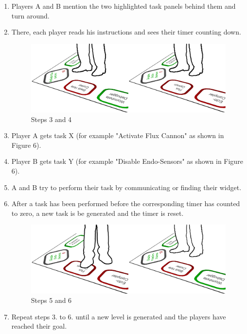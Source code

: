 \documentclass{sigchi}
\begin{document}
\begin{enumerate}
\item Players A and B mention the two highlighted task panels behind them and turn around.
\item There, each player reads his instructions and sees their timer counting down.


\begin{figure}[H]
\centering
\includegraphics[width=0.99\columnwidth]{walkthrough/klein/gamingarea3+4}
\caption{Steps 3 and 4}
\label{fig:gamingArea}
\end{figure}

\item Player A gets task X (for example "Activate Flux Cannon" as shown in Figure 6).
\item Player B gets task Y (for example "Disable Endo-Sensors" as shown in Figure 6).
\item A and B try to perform their task by communicating or finding their widget.
\item After a task has been performed before the corresponding timer has counted to zero, a new task is be generated and the timer is reset.

\begin{figure}[H]
\centering
\includegraphics[width=0.99\columnwidth]{walkthrough/klein/gamingarea5+6}
\caption{Steps 5 and 6}
\label{fig:gamingArea}
\end{figure}
\item Repeat steps 3. to 6. until a new level is generated and the players have reached their goal.
\end{enumerate}
\end{document}
